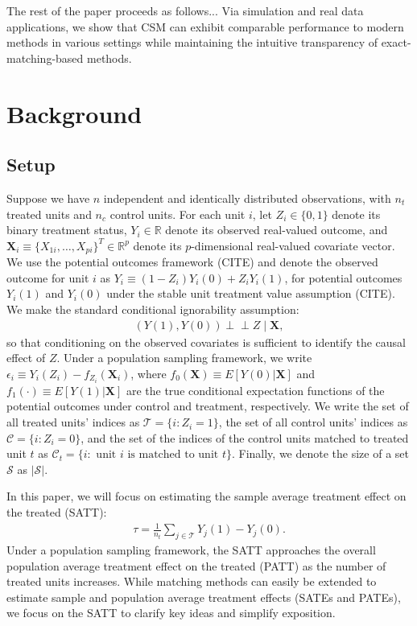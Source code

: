 \documentclass{article}
\newcommand{\bX}{\mathbf{X}}
\newcommand{\Ct}{\mathcal{C}_{t}}
\newcommand{\indep}{\perp \!\!\! \perp}
\begin{document}
The rest of the paper proceeds as follows...
Via simulation and real data applications, we show that CSM can exhibit comparable performance to modern methods in various settings while maintaining the intuitive transparency of exact-matching-based methods.

\section{Background}

\subsection{Setup}

Suppose we have $n$ independent and identically distributed observations, with $n_t$ treated units and $n_c$ control units.
For each unit $i$, let $Z_i \in \{0,1\}$ denote its binary treatment status, $Y_i \in \mathbb{R}$ denote its observed real-valued outcome, and $\mathbf{X}_i \equiv \{X_{1i}, \dots, X_{pi} \}^T \in \mathbb{R}^p$ denote its $p$-dimensional real-valued covariate vector.
We use the potential outcomes framework (CITE) and denote the observed outcome for unit $i$ as $Y_i \equiv (1-Z_i) Y_i(0) + Z_i Y_i(1)$, for potential outcomes $Y_i(1)$ and $Y_i(0)$ under the stable unit treatment value assumption (CITE).
We make the standard conditional ignorability assumption:
\begin{align*}
    (Y(1), Y(0)) \indep Z \mid \bX,
\end{align*}
so that conditioning on the observed covariates is sufficient to identify the causal effect of $Z$.
Under a population sampling framework, we write $\epsilon_i \equiv Y_i(Z_i) - f_{Z_i}(\bX_i)$, where $f_0(\bX) \equiv E[Y(0) | \bX]$ and $f_1(\cdot) \equiv E[Y(1) | \bX]$ are the true conditional expectation functions of the potential outcomes under control and treatment, respectively.
We write the set of all treated units' indices as $\mathcal{T} = \{i: Z_i=1\}$, the set of all control units' indices as $\mathcal{C} = \{i: Z_i=0\}$, and the set of the indices of the control units matched to treated unit $t$ as $\Ct = \{i: \text{ unit } i \text{ is matched to unit } t\}$.
Finally, we denote the size of a set $\mathcal{S}$ as $|\mathcal{S}|$.

In this paper, we will focus on estimating the sample average treatment effect on the treated (SATT):
\begin{align*}
    \tau = \frac{1}{n_t} \sum_{j \in \mathcal{T}} Y_j(1) - Y_j(0).
\end{align*}
Under a population sampling framework, the SATT approaches the overall population average treatment effect on the treated (PATT) as the number of treated units increases.
While matching methods can easily be extended to estimate sample and population average treatment effects (SATEs and PATEs), we focus on the SATT to clarify key ideas and simplify exposition.
\end{document}
